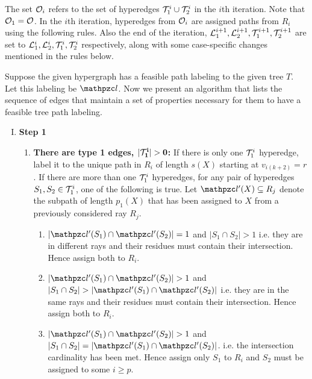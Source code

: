 \documentclass[MS]             %
              {iitmdiss_as}    %
\begin{document}
The set ${\cal O}_i$ refers to the set of hyperedges ${\cal T}_1^i \cup {\cal T}_2^i$
in the $i$th iteration.  Note that ${\cal O}_1 = {\cal O}$.  In the $i$th
iteration, hyperedges from ${\cal O}_i$ are assigned paths from $R_i$ using
the following rules. Also the end of the iteration, ${\cal L}_1^{i+1},
{\cal L}_2^{i+1}, {\cal T}_1^{i+1}, {\cal T}_2^{i+1}$ are set to ${\cal L}_1^{i},
{\cal L}_2^{i}, {\cal T}_1^{i}, {\cal T}_2^{i}$ respectively, along with some
case-specific changes mentioned in the rules below.

\noindent
Suppose the given hypergraph has a feasible path labeling to the given
tree $T$. Let this labeling be $\cl$. Now we present an algorithm that
lists the sequence of edges that maintain a set of properties
necessary for them to have a feasible tree path labeling.
\begin{enumerate}[I.]
\item {\bf Step 1}
  \begin{enumerate}
  \item {\bf {There are type 1
        edges, $\mathbf{|{\cal T}_1^i| > 0}$}:} 
  {If there is only one ${\cal T}_1^i$ hyperedge, label it to the unique
    path in $R_i$ of length $s(X)$ starting at $v_{i(k+2)}=r$. If
    there are more than one ${\cal T}_1^i$ hyperedges, for any pair of
    hyperedges $S_1, S_2 \in {\cal T}_1^i$, one of the following is
    true. Let $\cl'(X) \subseteq R_j$ denote the subpath of length
    $p_1(X)$ that has been assigned to $X$ from a previously
    considered ray $R_j$.}
  \begin{enumerate}[{\em Case }1. ]
  \item $|\cl'(S_1) \cap \cl'(S_2)| = 1$ and $|S_1 \cap S_2| > 1$
    i.e. they are in different rays and their residues must contain
    their intersection. Hence assign both to $R_i$.
  \item $|\cl'(S_1) \cap \cl'(S_2)| > 1$ and $|S_1 \cap S_2| >
    |\cl'(S_1) \cap \cl'(S_2)|$ i.e. they are in the same rays and
    their residues must contain their intersection. Hence assign both
    to $R_i$.
  \item $|\cl'(S_1) \cap \cl'(S_2)| > 1$ and $|S_1 \cap S_2| =
    |\cl'(S_1) \cap \cl'(S_2)|$. i.e. the intersection cardinality has
    been met. Hence assign only $S_1$ to $R_i$ and $S_2$ must be
    assigned to some $i \ge p$.

\end{enumerate}
\end{enumerate}
\end{enumerate}
\end{document}
